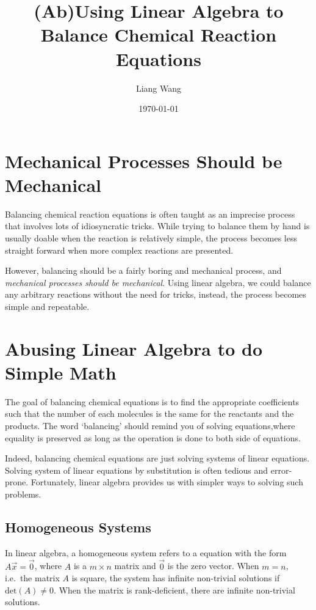 \documentclass{article}
\begin{document}
\title{(Ab)Using Linear Algebra to Balance Chemical Reaction Equations}
\author{Liang Wang}
\date{\today}
\maketitle

\section{Mechanical Processes Should be Mechanical}
Balancing chemical reaction equations is often taught as an imprecise process that involves lots of idiosyncratic tricks. While trying to balance them by hand is usually doable when the reaction is relatively simple, the process becomes less straight forward when more complex reactions are presented.

However, balancing should be a fairly boring and mechanical process, and \emph{mechanical processes should be mechanical}. Using linear algebra, we could balance any arbitrary reactions without the need for tricks, instead, the process becomes simple and repeatable.

\section{Abusing Linear Algebra to do Simple Math}
The goal of balancing chemical equations is to find the appropriate coefficients such that the number of each molecules is the same for the reactants and the products. The word `balancing' should remind you of solving equations,where equality is preserved as long as the operation is done to both side of equations.

Indeed, balancing chemical equations are just solving systems of linear equations. Solving system of linear equations by substitution is often tedious and error-prone. Fortunately, linear algebra provides us with simpler ways to solving such problems. 

\subsection{Homogeneous Systems}
In linear algebra, a homogeneous system refers to a equation with the form $A\vec{x} = \vec{0}$, where $A$ is a $m \times n$ matrix and $\vec{0}$ is the zero vector. When $m = n$, i.e.\ the matrix $A$ is square, the system has infinite non-trivial solutions if  $\mathrm{det}(A) \neq 0$. When the matrix is rank-deficient, there are infinite non-trivial solutions. 
\end{document}
